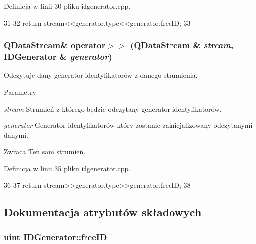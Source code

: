 Definicja w linii 30 pliku idgenerator.cpp.




\begin{DoxyCode}
31 {
32     return stream<<generator.type<<generator.freeID;
33 }
\end{DoxyCode}


\hypertarget{classIDGenerator_a4f86069b5b5ede60ff2e613fbcf10de4}{
\subsubsection[{operator$>$$>$}]{\setlength{\rightskip}{0pt plus 5cm}QDataStream\& operator$>$$>$ (QDataStream \& {\em stream}, \/  {\bf IDGenerator} \& {\em generator})}}
\label{classIDGenerator_a4f86069b5b5ede60ff2e613fbcf10de4}


Odczytuje dany generator identyfikatorów z danego strumienia. 


\begin{DoxyParams}{Parametry}
\item[{\em stream}]Strumień z którego będzie odczytany generator identyfikatorów. \item[{\em generator}]Generator identyfikatorów który zostanie zainicjalizowany odczytanymi danymi. \end{DoxyParams}
\begin{DoxyReturn}{Zwraca}
Ten sam strumień. 
\end{DoxyReturn}


Definicja w linii 35 pliku idgenerator.cpp.




\begin{DoxyCode}
36 {
37     return stream>>generator.type>>generator.freeID;
38 }
\end{DoxyCode}




\subsection{Dokumentacja atrybutów składowych}
\hypertarget{classIDGenerator_a5685b28917288954557a222cab550298}{
\subsubsection[{freeID}]{\setlength{\rightskip}{0pt plus 5cm}uint {\bf IDGenerator::freeID}}}
\label{classIDGenerator_a5685b28917288954557a222cab550298}


